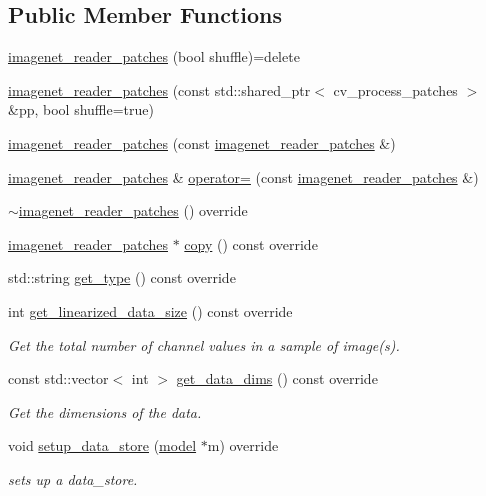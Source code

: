 \subsection*{Public Member Functions}
\begin{DoxyCompactItemize}
\item 
\hyperlink{classlbann_1_1imagenet__reader__patches_ab63e39d6e17dfb76b3ccb7df940c862e}{imagenet\+\_\+reader\+\_\+patches} (bool shuffle)=delete
\item 
\hyperlink{classlbann_1_1imagenet__reader__patches_a03a784a9beaf615e9bae9b54763e951b}{imagenet\+\_\+reader\+\_\+patches} (const std\+::shared\+\_\+ptr$<$ cv\+\_\+process\+\_\+patches $>$ \&pp, bool shuffle=true)
\item 
\hyperlink{classlbann_1_1imagenet__reader__patches_aca10e740934921c5c0399aae6e873a88}{imagenet\+\_\+reader\+\_\+patches} (const \hyperlink{classlbann_1_1imagenet__reader__patches}{imagenet\+\_\+reader\+\_\+patches} \&)
\item 
\hyperlink{classlbann_1_1imagenet__reader__patches}{imagenet\+\_\+reader\+\_\+patches} \& \hyperlink{classlbann_1_1imagenet__reader__patches_a02e20aa26fb3b024486b8d5c71d37aa7}{operator=} (const \hyperlink{classlbann_1_1imagenet__reader__patches}{imagenet\+\_\+reader\+\_\+patches} \&)
\item 
\hyperlink{classlbann_1_1imagenet__reader__patches_a4762a284ef646f6de1a0e0a7ac33d4ad}{$\sim$imagenet\+\_\+reader\+\_\+patches} () override
\item 
\hyperlink{classlbann_1_1imagenet__reader__patches}{imagenet\+\_\+reader\+\_\+patches} $\ast$ \hyperlink{classlbann_1_1imagenet__reader__patches_a6bb2c86a4416f8a74382951ab8827f1d}{copy} () const override
\item 
std\+::string \hyperlink{classlbann_1_1imagenet__reader__patches_adc6363b20f058260c674d92af2a6ef80}{get\+\_\+type} () const override
\item 
int \hyperlink{classlbann_1_1imagenet__reader__patches_a09ce692ca31d52424dea5395ad6c8b2b}{get\+\_\+linearized\+\_\+data\+\_\+size} () const override
\begin{DoxyCompactList}\small\item\em Get the total number of channel values in a sample of image(s). \end{DoxyCompactList}\item 
const std\+::vector$<$ int $>$ \hyperlink{classlbann_1_1imagenet__reader__patches_a4d5c6b9780908d9beb5c6d3f017c38b5}{get\+\_\+data\+\_\+dims} () const override
\begin{DoxyCompactList}\small\item\em Get the dimensions of the data. \end{DoxyCompactList}\item 
void \hyperlink{classlbann_1_1imagenet__reader__patches_afad50e94c5d6bde9dff2abe5bad50e11}{setup\+\_\+data\+\_\+store} (\hyperlink{classlbann_1_1model}{model} $\ast$m) override
\begin{DoxyCompactList}\small\item\em sets up a data\+\_\+store. \end{DoxyCompactList}\end{DoxyCompactItemize}
